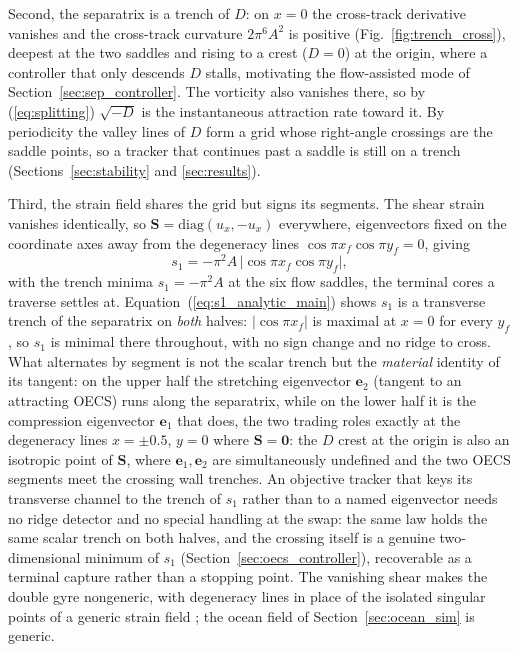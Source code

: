 \documentclass[lettersize,journal]{IEEEtran}
\begin{document}
Second, the separatrix is a trench of $D$: on $x = 0$ the cross-track
derivative vanishes and the cross-track curvature $2\pi^6 A^2$ is
positive (Fig.~\ref{fig:trench_cross}), deepest at the two saddles and
rising to a crest ($D = 0$) at the origin, where a controller that
only descends $D$ stalls, motivating the flow-assisted mode of
Section~\ref{sec:sep_controller}. The vorticity also vanishes there, so
by (\ref{eq:splitting}) $\sqrt{-D}$ is the instantaneous attraction
rate toward it. By periodicity the valley lines of $D$ form a grid
whose right-angle crossings are the saddle points, so a tracker that
continues past a saddle is still on a trench
(Sections~\ref{sec:stability} and \ref{sec:results}).

Third, the strain field shares the grid but signs its segments. The
shear strain vanishes identically, so $\mathbf{S} =
\mathrm{diag}(u_x, -u_x)$ everywhere, eigenvectors fixed on the
coordinate axes away from the degeneracy lines
$\cos\pi x_f \cos\pi y_f = 0$, giving
\begin{equation}
    s_1 = -\pi^2 A\,\lvert\cos \pi x_f \cos \pi y_f\rvert,
    \label{eq:s1_analytic_main}
\end{equation}
with the trench minima $s_1 = -\pi^2 A$ at the six flow saddles, the
terminal cores a traverse settles at.
Equation~(\ref{eq:s1_analytic_main}) shows $s_1$ is a transverse trench
of the separatrix on \emph{both} halves: $\lvert\cos\pi x_f\rvert$ is
maximal at $x = 0$ for every $y_f$, so $s_1$ is minimal there throughout,
with no sign change and no ridge to cross. What alternates by segment is
not the scalar trench but the \emph{material} identity of its tangent:
on the upper half the stretching eigenvector $\mathbf{e}_2$ (tangent to
an attracting OECS) runs along the separatrix, while on the lower half
it is the compression eigenvector $\mathbf{e}_1$ that does, the two
trading roles exactly at the degeneracy lines $x = \pm 0.5$, $y = 0$
where $\mathbf{S} = \mathbf{0}$: the $D$ crest at the origin is also an
isotropic point of $\mathbf{S}$, where $\mathbf{e}_1,\mathbf{e}_2$ are
simultaneously undefined and the two OECS segments meet the crossing
wall trenches. An objective tracker that keys its transverse channel to
the trench of $s_1$ rather than to a named eigenvector needs no ridge
detector and no special handling at the swap: the same law holds the
same scalar trench on both halves, and the crossing itself is a genuine
two-dimensional minimum of $s_1$
(Section~\ref{sec:oecs_controller}), recoverable as a terminal capture
rather than a stopping point. The vanishing shear makes the double gyre
nongeneric, with degeneracy lines in place of the isolated singular
points of a generic strain field \cite{17}; the ocean field of
Section~\ref{sec:ocean_sim} is generic.
\end{document}
